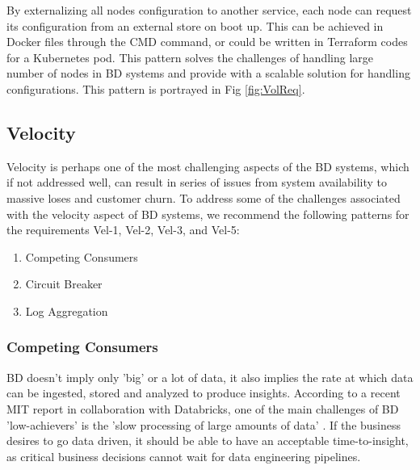 \documentclass{bmcart}
\begin{document}
By externalizing all nodes configuration to another service, each node can request its configuration from an external store on boot up. This can be achieved in Docker files through the CMD command, or could be written in Terraform codes for a Kubernetes pod. This pattern solves the challenges of handling large number of nodes in BD systems and provide with a scalable solution for handling configurations. This pattern is portrayed in Fig \ref{fig:VolReq}.


\subsection{Velocity}

Velocity is perhaps one of the most challenging aspects of the BD systems, which if not addressed well, can result in series of issues from system availability to massive loses and customer churn. To address some of the challenges associated with the velocity aspect of BD systems, we recommend the following patterns for the requirements Vel-1, Vel-2, Vel-3, and Vel-5:


\begin{enumerate}
  \item Competing Consumers
  \item Circuit Breaker
  \item Log Aggregation
\end{enumerate}


\subsubsection{Competing Consumers}

BD doesn't imply only 'big' or a lot of data, it also implies the rate at which data can be ingested, stored and analyzed to produce insights. According to a recent MIT report in collaboration with Databricks, one of the main challenges of BD 'low-achievers' is the 'slow processing of large amounts of data' \cite{DataBricksSurvey}. If the business desires to go data driven, it should be able to have an acceptable time-to-insight, as critical business decisions cannot wait for data engineering pipelines. 
\end{document}
